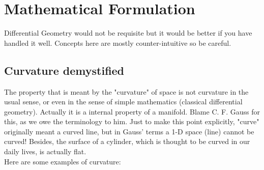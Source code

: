 \documentclass[openany,10pt]{book}
\theoremstyle{definition}
\theoremstyle{definition}
\theoremstyle{remark}
\begin{document}
\chapter{Mathematical Formulation}\label{mathf}
Differential Geometry would not be requisite but it would be better if you have handled it well. Concepts here are mostly counter-intuitive so be careful.

\section{Curvature demystified}

The property that is meant by the "curvature" of space is not curvature in the usual sense, or even in the sense of simple mathematics (classical differential geometry). Actually it is a internal property of a manifold.  Blame C. F. Gauss for this, as we owe the terminology to him.  Just to make this point explicitly, "curve" originally meant a curved line, but in Gauss' terms a 1-D space (line) cannot be curved! Besides, the surface of a cylinder, which is thought to be curved in our daily lives, is actually flat.\\
Here are some examples of curvature:
\end{document}
